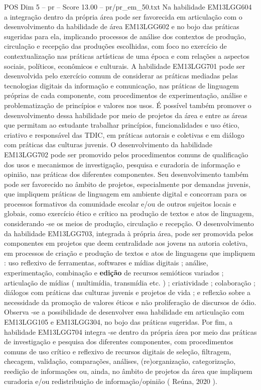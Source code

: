 \begin{textsample}{POS Dim 5 – pr – Score 13.00 – pr/pr\_em\_50.txt}
Na habilidade EM13LGG604 a integração dentro da própria área pode ser favorecida em articulação com o desenvolvimento da habilidade de área EM13LGG602 e no bojo das práticas sugeridas para ela, implicando processos de análise dos contextos de produção, circulação e recepção das produções escolhidas, com foco no exercício de contextualização nas práticas artísticas de uma época e com relações a aspectos sociais, políticos, econômicos e culturais.
A habilidade EM13LGG701 pode ser desenvolvida pelo exercício comum de considerar as práticas mediadas pelas tecnologias digitais da informação e comunicação, nas práticas de linguagem próprias de cada componente, com procedimentos de experimentação, análise e problematização de princípios e valores nos usos.
É possível também promover o desenvolvimento dessa habilidade por meio de projetos da área e entre as áreas que permitam ao estudante trabalhar princípios, funcionalidades e uso ético, criativo e responsável das TDIC, em práticas autorais e coletivas e em diálogo com práticas das culturas juvenis.
O desenvolvimento da habilidade EM13LGG702 pode ser promovido pelos procedimentos comuns de qualificação dos usos e mecanismos de investigação, pesquisa e curadoria de informação e opinião, nas práticas dos diferentes componentes.
Seu desenvolvimento também pode ser favorecido no âmbito de projetos, especialmente por demandas juvenis, que impliquem práticas de linguagem em ambiente digital e concorram para os processos formativos da comunidade escolar e/ou de outros sujeitos locais e globais, como exercício ético e crítico na produção de textos e atos de linguagem, considerando -se os meios de produção, circulação e recepção.
O desenvolvimento da habilidade EM13LGG703, integrada à própria área, pode ser promovida pelos componentes em projetos que deem centralidade aos jovens na autoria coletiva, em processos de criação e produção de textos e atos de linguagens que impliquem : uso reflexivo de ferramentas, softwares e mídias digitais ; análise, experimentação, combinação e \textbf{edição} de recursos semióticos variados ; articulação de mídias ( multimídia, transmídia etc. ) ; criatividade ; colaboração ; diálogos com práticas das culturas juvenis e projetos de vida ; e reflexão sobre a necessidade da promoção de valores éticos e não proliferação de discursos de ódio.
Observa -se a possibilidade de desenvolver essa habilidade em articulação com EM13LGG105 e EM13LGG304, no bojo das práticas sugeridas.
Por fim, a habilidade EM13LGG704 integra -se dentro da própria área por meio das práticas de investigação e pesquisa dos diferentes componentes, com procedimentos comuns de uso crítico e reflexivo de recursos digitais de seleção, filtragem, checagem, validação, comparações, análises, (re)organização, categorização, reedição de informações ou, ainda, no âmbito de projetos da área que impliquem curadoria e/ou redistribuição de informação/opinião ( Reúna, 2020 ).

\end{textsample}
